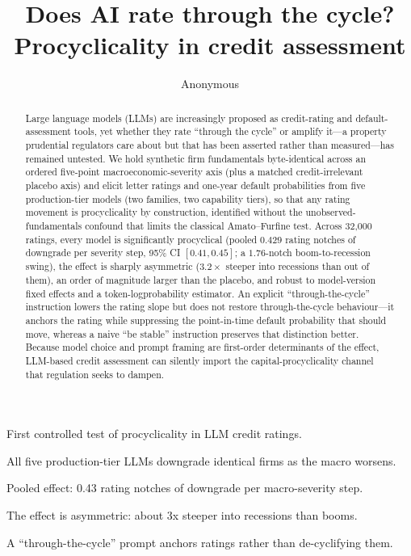 \documentclass[a4paper,fleqn]{cas-sc}
\begin{document}
\let\WriteBookmarks\relax
\def\floatpagepagefraction{1}
\def\textpagefraction{.001}

\shortauthors{}

\title[mode=title]{Does AI rate through the cycle? Procyclicality in credit assessment}

\author[1]{Anonymous}

\begin{abstract}
Large language models (LLMs) are increasingly proposed as credit-rating and default-assessment
tools, yet whether they rate ``through the cycle'' or amplify it---a property prudential regulators
care about but that has been asserted rather than measured---has remained untested. We hold
synthetic firm fundamentals byte-identical across an ordered five-point macroeconomic-severity axis
(plus a matched credit-irrelevant placebo axis) and elicit letter ratings and one-year default
probabilities from five production-tier models (two families, two capability tiers), so that any rating movement is procyclicality by
construction, identified without the unobserved-fundamentals confound that limits the classical
Amato--Furfine test. Across 32{,}000 ratings, every model is significantly procyclical (pooled
$0.429$ rating notches of downgrade per severity step, 95\% CI $[0.41,0.45]$; a $1.76$-notch
boom-to-recession swing), the effect is sharply asymmetric ($3.2\times$ steeper into recessions than
out of them), an order of magnitude larger than the placebo, and robust to model-version fixed
effects and a token-log\-probability estimator. An explicit ``through-the-cycle'' instruction lowers
the rating slope but does not restore through-the-cycle behaviour---it anchors the rating while
suppressing the point-in-time default probability that should move, whereas a naive ``be stable''
instruction preserves that distinction better. Because model choice and prompt framing are
first-order determinants of the effect, LLM-based credit assessment can silently import the
capital-procyclicality channel that regulation seeks to dampen.
\end{abstract}

\begin{highlights}
\item First controlled test of procyclicality in LLM credit ratings.
\item All five production-tier LLMs downgrade identical firms as the macro worsens.
\item Pooled effect: 0.43 rating notches of downgrade per macro-severity step.
\item The effect is asymmetric: about 3x steeper into recessions than booms.
\item A ``through-the-cycle'' prompt anchors ratings rather than de-cyclifying them.
\end{highlights}
\end{document}

